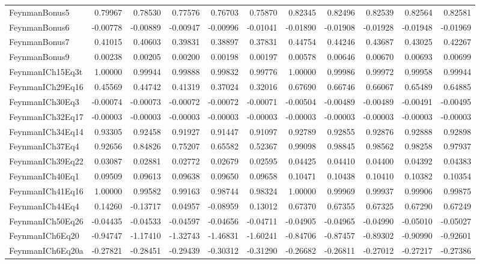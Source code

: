 \begin{tabular}{lrrrrrrrrrr}
FeynmanBonus5 & 0.79967 & 0.78530 & 0.77576 & 0.76703 & 0.75870 & 0.82345 & 0.82496 & 0.82539 & 0.82564 & 0.82581 \\
FeynmanBonus6 & -0.00778 & -0.00889 & -0.00947 & -0.00996 & -0.01041 & -0.01890 & -0.01908 & -0.01928 & -0.01948 & -0.01969 \\
FeynmanBonus7 & 0.41015 & 0.40603 & 0.39831 & 0.38897 & 0.37831 & 0.44754 & 0.44246 & 0.43687 & 0.43025 & 0.42267 \\
FeynmanBonus9 & 0.00238 & 0.00205 & 0.00200 & 0.00198 & 0.00197 & 0.00578 & 0.00646 & 0.00670 & 0.00693 & 0.00699 \\
FeynmanICh15Eq3t & 1.00000 & 0.99944 & 0.99888 & 0.99832 & 0.99776 & 1.00000 & 0.99986 & 0.99972 & 0.99958 & 0.99944 \\
FeynmanICh29Eq16 & 0.45569 & 0.44742 & 0.41319 & 0.37024 & 0.32016 & 0.67690 & 0.66746 & 0.66067 & 0.65489 & 0.64885 \\
FeynmanICh30Eq3 & -0.00074 & -0.00073 & -0.00072 & -0.00072 & -0.00071 & -0.00504 & -0.00489 & -0.00489 & -0.00491 & -0.00495 \\
FeynmanICh32Eq17 & -0.00003 & -0.00003 & -0.00003 & -0.00003 & -0.00003 & -0.00003 & -0.00003 & -0.00003 & -0.00003 & -0.00003 \\
FeynmanICh34Eq14 & 0.93305 & 0.92458 & 0.91927 & 0.91447 & 0.91097 & 0.92789 & 0.92855 & 0.92876 & 0.92888 & 0.92898 \\
FeynmanICh37Eq4 & 0.92656 & 0.84826 & 0.75207 & 0.65582 & 0.52367 & 0.99098 & 0.98845 & 0.98562 & 0.98258 & 0.97937 \\
FeynmanICh39Eq22 & 0.03087 & 0.02881 & 0.02772 & 0.02679 & 0.02595 & 0.04425 & 0.04410 & 0.04400 & 0.04392 & 0.04383 \\
FeynmanICh40Eq1 & 0.09509 & 0.09613 & 0.09638 & 0.09650 & 0.09658 & 0.10471 & 0.10438 & 0.10410 & 0.10382 & 0.10354 \\
FeynmanICh41Eq16 & 1.00000 & 0.99582 & 0.99163 & 0.98744 & 0.98324 & 1.00000 & 0.99969 & 0.99937 & 0.99906 & 0.99875 \\
FeynmanICh44Eq4 & 0.14260 & -0.13717 & 0.04957 & -0.08959 & 0.13012 & 0.67370 & 0.67355 & 0.67325 & 0.67290 & 0.67249 \\
FeynmanICh50Eq26 & -0.04435 & -0.04533 & -0.04597 & -0.04656 & -0.04711 & -0.04905 & -0.04965 & -0.04990 & -0.05010 & -0.05027 \\
FeynmanICh6Eq20 & -0.94747 & -1.17410 & -1.32743 & -1.46831 & -1.60241 & -0.84706 & -0.87457 & -0.89302 & -0.90990 & -0.92601 \\
FeynmanICh6Eq20a & -0.27821 & -0.28451 & -0.29439 & -0.30312 & -0.31290 & -0.26682 & -0.26811 & -0.27012 & -0.27217 & -0.27386 \\

\end{tabular}
